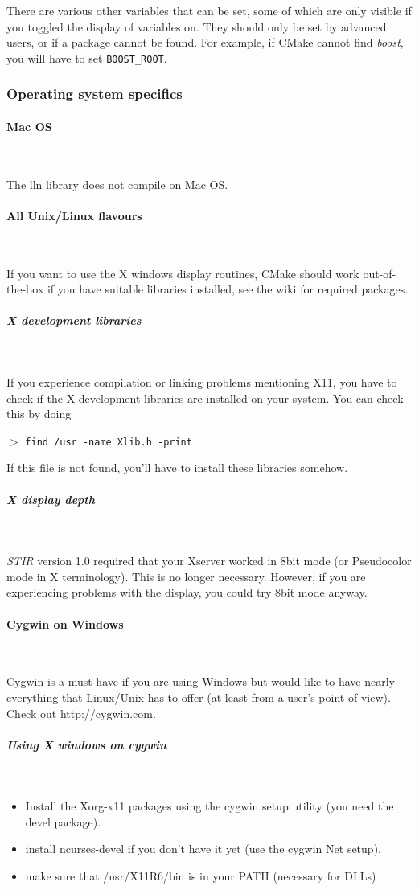 \documentclass{article}
\newcommand{\subsubsubsection}[1]{\paragraph{#1}\mbox{} \\}
\newcommand{\subsubsubsubsection}[1]{\subparagraph{#1} \mbox{} \\}
\newcommand{\cmdline}[1]{\par \noindent $>$ \texttt{#1}\par}
\begin{document}
There are various other variables that can be set, some of which are only visible if you toggled
the display of  variables on. They should only be set by advanced users, or if a package
cannot be found. For example, if CMake cannot find \textit{boost}, you will have to set \texttt{BOOST\_ROOT}.

\subsubsection{
Operating system specifics}

{ \subsubsubsection{Mac OS}
}

The lln library does not compile on Mac OS. 

{ \subsubsubsection{All Unix/Linux flavours}
}

If you want to use the X windows display routines,  CMake
should work out-of-the-box if you have suitable libraries installed, see the wiki
for required packages.

{ \subsubsubsubsection{X development libraries}
}

If you experience compilation 
or linking problems mentioning X11, you have to check if the 
X development libraries are installed on your system. You can 
check this by doing
\cmdline{find /usr -name Xlib.h -print}

If this file is not found, you'll have to install these libraries 
somehow.

{ \subsubsubsubsection{X display depth}
}

\textit{STIR} version 1.0 required that your Xserver worked in 8bit 
mode (or Pseudocolor mode in X terminology). This is no longer 
necessary. However, if you are experiencing problems with the 
display, you could try 8bit mode anyway.



{ \subsubsubsection{Cygwin on Windows}
}

Cygwin is a must-have if you are using Windows but would like 
to have nearly everything that Linux/Unix has to offer (at least 
from a user's point of view). Check out http://cygwin.com.

{ \subsubsubsubsection{Using X windows on cygwin}
}
\begin{itemize}
\item Install the Xorg-x11 packages using the cygwin setup utility 
(you need the devel package).
\item 
install ncurses-devel if you don't have it yet (use the cygwin 
Net setup).
\item make sure that /usr/X11R6/bin is in your PATH (necessary 
for DLLs)
\end{itemize}
\end{document}
